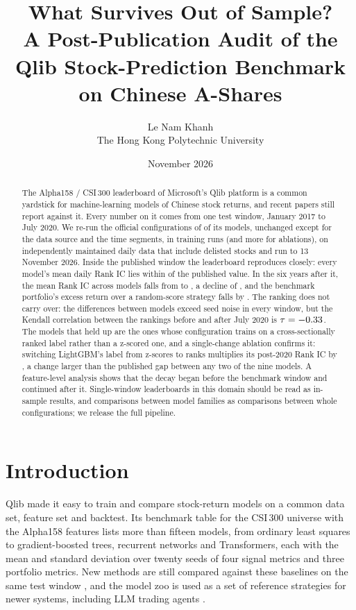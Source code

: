 \documentclass[11pt]{article}
\title{What Survives Out of Sample?\\[2pt]
\large A Post-Publication Audit of the Qlib Stock-Prediction Benchmark on Chinese A-Shares}
\author{Le Nam Khanh\\[2pt]
\small The Hong Kong Polytechnic University}
\date{November 2026}
\begin{document}
\maketitle

\begin{abstract}
The Alpha158 / CSI\,300 leaderboard of Microsoft's Qlib platform is a common yardstick for machine-learning models of Chinese stock returns, and recent papers still report against it.
Every number on it comes from one test window, January 2017 to July 2020.
We re-run the official configurations of \NModels{} of its models, unchanged except for the data source and the time segments, in \NRunsAll{} training runs (and \NRunsAblation{} more for ablations), on independently maintained daily data that include delisted stocks and run to 13 November 2026.
Inside the published window the leaderboard reproduces closely: every model's mean daily Rank IC lies within \ReproMaxGap{} of the published value.
In the six years after it, the mean Rank IC across models falls from \MeanRankICPub{} to \MeanRankICPost{}, a decline of \MeanDecayPct{}, and the benchmark portfolio's excess return over a random-score strategy falls by \AboveNullDrop{}.
The ranking does not carry over: the differences between models exceed seed noise in every window, but the Kendall correlation between the rankings before and after July 2020 is $\tau=-0.33$.
The models that held up are the ones whose configuration trains on a cross-sectionally ranked label rather than a z-scored one, and a single-change ablation confirms it: switching LightGBM's label from z-scores to ranks multiplies its post-2020 Rank IC by \AblLGBRankRatio{}, a change larger than the published gap between any two of the nine models.
A feature-level analysis shows that the decay began before the benchmark window and continued after it.
Single-window leaderboards in this domain should be read as in-sample results, and comparisons between model families as comparisons between whole configurations; we release the full pipeline.
\end{abstract}

\section{Introduction}

Qlib \citep{yang2020qlib} made it easy to train and compare stock-return models on a common data set, feature set and backtest.
Its benchmark table for the CSI\,300 universe with the Alpha158 features lists more than fifteen models, from ordinary least squares to gradient-boosted trees, recurrent networks and Transformers, each with the mean and standard deviation over twenty seeds of four signal metrics and three portfolio metrics.
New methods are still compared against these baselines on the same test window \citep[e.g.][]{lin2025cspo}, and the model zoo is used as a set of reference strategies for newer systems, including LLM trading agents \citep{zhu2026ktdfin}.
\end{document}

